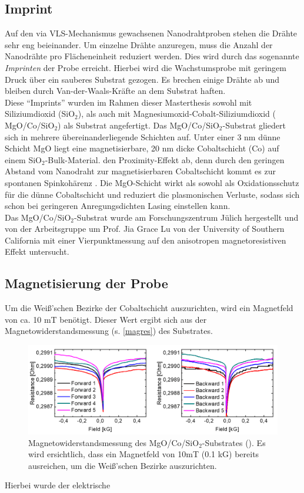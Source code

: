 \subsection{Imprint} Auf den via VLS-Mechanismus gewachsenen Nanodrahtproben
stehen die Drähte sehr eng beieinander. Um einzelne Drähte anzuregen, muss die
Anzahl der Nanodrähte pro Flächeneinheit reduziert werden. Dies wird durch das
sogenannte \textit{Imprinten} der Probe erreicht. Hierbei wird die
Wachstumsprobe mit geringem Druck über ein sauberes Substrat gezogen. Es brechen
einige Drähte ab und bleiben durch Van-der-Waals-Kräfte an dem Substrat
haften.\\ Diese ``Imprints'' wurden im Rahmen dieser Masterthesis sowohl mit
Siliziumdioxid (SiO$_\text{2}$), als auch mit
Magnesiumoxid-Cobalt-Siliziumdioxid ( MgO/Co/SiO$_\text{2}$) als Substrat
angefertigt. Das MgO/Co/SiO$_\text{2}$-Substrat gliedert sich in mehrere
übereinanderliegende Schichten auf. Unter einer 3 nm dünne Schicht MgO liegt
eine  magnetisierbare, 20 nm dicke Cobaltschicht (Co) auf einem
SiO$_2$-Bulk-Material. %
den Proximity-Effekt ab, denn durch den geringen Abstand vom Nanodraht zur
magnetisierbaren Cobaltschicht kommt es zur spontanen Spinkohärenz
\cite{Epstein.2002}. Die MgO-Schicht wirkt als sowohl als Oxidationsschutz für
die dünne Cobaltschicht und reduziert die plasmonischen Verluste, sodass sich
schon bei geringeren Anregungsdichten Lasing einstellen kann.\\ Das
MgO/Co/SiO$_\text{2}$-Substrat wurde am Forschungszentrum Jülich hergestellt und
von der Arbeitsgruppe um Prof. Jia Grace Lu von der University of Southern
California mit einer Vierpunktmessung auf den anisotropen magnetoresistiven
Effekt untersucht. \subsection{Magnetisierung der Probe} \label{MagProb} Um die
Weiß'schen Bezirke der Cobaltschicht auszurichten, wird ein Magnetfeld von ca.
10 mT benötigt. Dieser Wert ergibt sich aus der Magnetowiderstandsmessung (s.
\autoref{magres}) des Substrates.\begin{figure}[b] \centering
\includegraphics[width=.85\textwidth]{Bilder/Methodik/magnres}
\caption[Magnetowiderstandsmessung des
MgO/Co/SiO$_\text{2}$-Substrates]{Magnetowiderstandsmessung des
MgO/Co/SiO$_\text{2}$-Substrates (\cite{Mag}). Es wird ersichtlich, dass ein
Magnetfeld von 10mT (0.1 kG) bereits ausreichen, um die Weiß'schen Bezirke
auszurichten.} \label{magres} \end{figure}Hierbei wurde der elektrische
